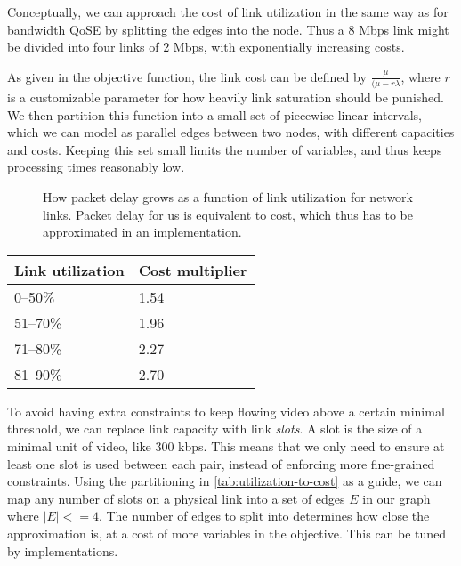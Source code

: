 Conceptually, we can approach the cost of link utilization in the same way as for bandwidth QoSE by splitting the edges into the node. Thus a 8 Mbps link might be divided into four links of 2 Mbps, with exponentially increasing costs.

As given in the objective function, the link cost can be defined by $\frac{\mu}{(\mu - r\lambda}$, where $r$ is a customizable parameter for how heavily link saturation should be punished. We then partition this function into a small set of piecewise linear intervals, which we can model as parallel edges between two nodes, with different capacities and costs. Keeping this set small limits the number of variables, and thus keeps processing times reasonably low.

\begin{figure}
    \centering
    \caption{How packet delay grows as a function of link utilization for network links. Packet delay for us is equivalent to cost, which thus has to be approximated in an implementation.}
    \label{fig:utility-latency}
\end{figure}


\begin{center}
    \label{tab:utilization-to-cost}
    \begin{tabular}{| l | l |}
    \hline
    \textbf{Link utilization} & \textbf{Cost multiplier} \\ \hline
    0--50\% & 1.54 \\ \hline
    51--70\% & 1.96 \\ \hline
    71--80\% & 2.27 \\ \hline
    81--90\% & 2.70 \\ \hline
    \end{tabular}
\end{center}

To avoid having extra constraints to keep flowing video above a certain minimal threshold, we can replace link capacity with link \emph{slots}. A slot is the size of a minimal unit of video, like 300 kbps. This means that we only need to ensure at least one slot is used between each pair, instead of enforcing more fine-grained constraints. Using the partitioning in \autoref{tab:utilization-to-cost} as a guide, we can map any number of slots on a physical link into a set of edges $E$ in our graph where $|E| <= 4$. The number of edges to split into determines how close the approximation is, at a cost of more variables in the objective. This can be tuned by implementations.

